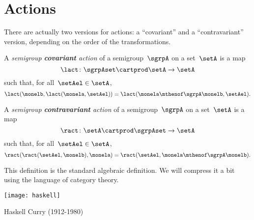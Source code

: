 
\section{Actions}
\label{sec:actions}

There are actually two versions for actions: a ``covariant'' and a ``contravariant'' version, depending on the order of the transformations.

\begin{ctdefinition}
	\label{def:semigroup-cov-action-prelim}
	A \emph{semigroup \textbf{covariant} action} of a semigroup~$\sgrpA$ on a set~$\setA$ is a map
	\begin{equation}
		\label{eq:lact}
		\lact \colon \sgrpAset \cartprod \setA \to \setA
	\end{equation}
	such that, for all~$\setAel \in \setA$,
	\begin{equation}
		\label{eq:lact1cond}
		\lact(\monelb, \lact(\monela, \setAel)) = \lact(\monela \mthenof\sgrpA \monelb, \setAel).
	\end{equation}
\end{ctdefinition}

\begin{ctdefinition}
	\label{def:semigroup-contra-action-prelim}
	A \emph{semigroup \textbf{contravariant} action} of a semigroup~$\sgrpA$ on a set~$\setA$ is a map
	\begin{equation}
		\label{eq:ract}
		\ract \colon \setA \cartprod \sgrpAset \to \setA
	\end{equation}
	such that, for all~$\setAel \in \setA$,
	\begin{equation}
		\label{eq:ract1cond}
		\ract(\ract(\setAel, \monelb), \monela) = \ract(\setAel, \monela \mthenof\sgrpA \monelb).
	\end{equation}
\end{ctdefinition}

This definition is the standard algebraic definition.
We will compress it a bit using the language of category theory.

\begin{marginfigure}
	\texttt{[image: haskell]}
	\caption{Haskell Curry (1912-1980)}
	\label{fig:haskell-curry}
\end{marginfigure}

